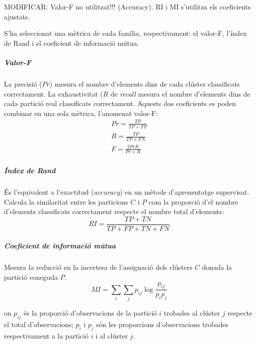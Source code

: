 \documentclass[CAT,BIB]{TFUOC}%
\newcommand{\todo}[1]{
            \begin{tcolorbox}[title=ToDo!, colback=red!5!white, colframe=red!50!black, coltext=red!50!black]
            #1
            \end{tcolorbox}}
\begin{document}
\todo{MODIFICAR: Valor-F no utilitzat!!! (Accuracy). RI i MI s'utilitza els coeficients ajustats.}

            S'ha seleccionat una mètrica de cada família, respectivament:
            el valor-F,
            l'índex de Rand
            i el coeficient de informació mútua.

            \subparagraph{Valor-F}
                La precisió ($Pr$) mesura
                el nombre d'elements dins de cada clúster classificats correctament.
                La exhaustivitat ($R$ de \textit{recall} mesura
                el nombre d'elements dins de cada partició real classificats correctament.
                Aquests dos coeficients es poden combinar
                en una sola mètrica, l'anomenat valor-F:
                \begin{gather}
                \label{eq:precision}
                    Pr = \frac{TP}{TP + FP}
                \\
                \label{eq:recall}
                    R = \frac{TP}{TP + FN}
                \\
                \label{eq:f_measure}
                    F = \frac{2 Pr R}{Pr + R}
                \end{gather}

            \subparagraph{Índex de Rand}
                És l'equivalent a l'exactitud (\textit{accuracy})
                en un mètode d'aprenentatge supervisat.
                Calcula la similaritat entre les particions $C$ i $P$
                com la proporció d'el nombre d'elements classificats correctament
                respecte el nombre total d'elements:
                \begin{equation}
                \label{eq:rand}
                    RI = \frac{TP + TN}{TP + FP + TN + FN}
                \end{equation}

            \subparagraph{Coeficient de informació mútua}
                Mesura la reducció en la incertesa
                de l'assignació dels clústers $C$
                donada la partició coneguda $P$.
                \begin{equation}
                \label{eq:mi}
                    MI = \sum_i \sum_j p_{ij} \log \frac{p_{ij}}{p_i p_j}
                \end{equation}

                on $p_{ij}$ és la proporció d'observacions
                de la partició $i$ trobades al clúster $j$
                respecte el total d'observacions;
                $p_i$ i $p_j$ són les proporcions d'observacions
                trobades respectivament a la partició $i$
                i al clúster $j$.
\end{document}
